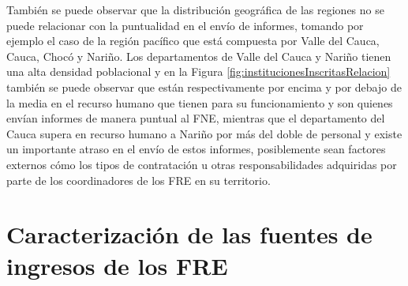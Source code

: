 \documentclass[
]{book}
\begin{document}
También se puede observar que la distribución geográfica de las regiones no se puede relacionar con la puntualidad en el envío de informes, tomando por ejemplo el caso de la región pacífico que está compuesta por Valle del Cauca, Cauca, Chocó y Nariño. Los departamentos de Valle del Cauca y Nariño tienen una alta densidad poblacional y en la Figura \ref{fig:institucionesInscritasRelacion} también se puede observar que están respectivamente por encima y por debajo de la media en el recurso humano que tienen para su funcionamiento y son quienes envían informes de manera puntual al FNE, mientras que el departamento del Cauca supera en recurso humano a Nariño por más del doble de personal y existe un importante atraso en el envío de estos informes, posiblemente sean factores externos cómo los tipos de contratación u otras responsabilidades adquiridas por parte de los coordinadores de los FRE en su territorio.

\hypertarget{caracterizaciuxf3n-de-las-fuentes-de-ingresos-de-los-fre}{%
\section{Caracterización de las fuentes de ingresos de los FRE}\label{caracterizaciuxf3n-de-las-fuentes-de-ingresos-de-los-fre}}
\end{document}
